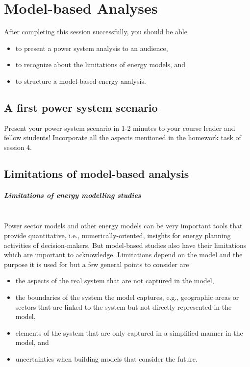\setchapterpreamble[u]{\margintoc}
\chapter{Model-based Analyses}

After completing this session successfully, you should be able

\begin{itemize}
    \item to present a power system analysis to an audience,
    \item to recognize about the limitations of energy models, and
    \item to structure a model-based energy analysis.
\end{itemize}

\section{A first power system scenario}
\begin{kaobox}[frametitle=Task]
Present your power system scenario in 1-2 minutes to your course leader and fellow students! Incorporate all the aspects mentioned in the homework task of session 4.
\end{kaobox}


\section{Limitations of model-based analysis}

\paragraph*{Limitations of energy modelling studies}~\\

Power sector models and other energy models can be very important tools that provide quantitative, i.e., numerically-oriented, insights for energy planning activities of decision-makers. But model-based studies also have their limitations which are important to acknowledge. Limitations depend on the model and the purpose it is used for but a few general points to consider are
\begin{itemize}
\item the aspects of the real system that are not captured in the model,
\item the boundaries of the system the model captures, e.g., geographic areas or sectors that are linked to the system but not directly represented in the model,
\item elements of the system that are only captured in a simplified manner in the model, and
\item uncertainties when building models that consider the future.

\end{itemize}

